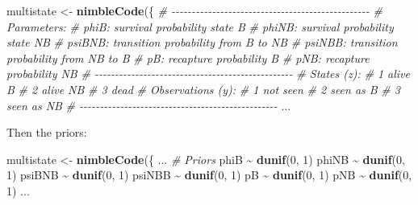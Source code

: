 \documentclass[
  12pt,
]{krantz}
\newenvironment{Shaded}{\begin{snugshade}}{\end{snugshade}}
\newcommand{\CommentTok}[1]{\textcolor[rgb]{0.56,0.35,0.01}{\textit{#1}}}
\newcommand{\DecValTok}[1]{\textcolor[rgb]{0.00,0.00,0.81}{#1}}
\newcommand{\FunctionTok}[1]{\textcolor[rgb]{0.13,0.29,0.53}{\textbf{#1}}}
\newcommand{\NormalTok}[1]{#1}
\newcommand{\OtherTok}[1]{\textcolor[rgb]{0.56,0.35,0.01}{#1}}
\newcommand{\SpecialCharTok}[1]{\textcolor[rgb]{0.81,0.36,0.00}{\textbf{#1}}}
\begin{document}
\begin{Shaded}
\begin{Highlighting}[]
\NormalTok{multistate }\OtherTok{\textless{}{-}} \FunctionTok{nimbleCode}\NormalTok{(\{}
  \CommentTok{\# {-}{-}{-}{-}{-}{-}{-}{-}{-}{-}{-}{-}{-}{-}{-}{-}{-}{-}{-}{-}{-}{-}{-}{-}{-}{-}{-}{-}{-}{-}{-}{-}{-}{-}{-}{-}{-}{-}{-}{-}{-}{-}{-}{-}{-}{-}{-}{-}{-}}
  \CommentTok{\# Parameters:}
  \CommentTok{\# phiB: survival probability state B}
  \CommentTok{\# phiNB: survival probability state NB}
  \CommentTok{\# psiBNB: transition probability from B to NB}
  \CommentTok{\# psiNBB: transition probability from NB to B}
  \CommentTok{\# pB: recapture probability B}
  \CommentTok{\# pNB: recapture probability NB}
  \CommentTok{\# {-}{-}{-}{-}{-}{-}{-}{-}{-}{-}{-}{-}{-}{-}{-}{-}{-}{-}{-}{-}{-}{-}{-}{-}{-}{-}{-}{-}{-}{-}{-}{-}{-}{-}{-}{-}{-}{-}{-}{-}{-}{-}{-}{-}{-}{-}{-}{-}{-}}
  \CommentTok{\# States (z):}
  \CommentTok{\# 1 alive B}
  \CommentTok{\# 2 alive NB}
  \CommentTok{\# 3 dead}
  \CommentTok{\# Observations (y):}
  \CommentTok{\# 1 not seen}
  \CommentTok{\# 2 seen as B}
  \CommentTok{\# 3 seen as NB}
  \CommentTok{\# {-}{-}{-}{-}{-}{-}{-}{-}{-}{-}{-}{-}{-}{-}{-}{-}{-}{-}{-}{-}{-}{-}{-}{-}{-}{-}{-}{-}{-}{-}{-}{-}{-}{-}{-}{-}{-}{-}{-}{-}{-}{-}{-}{-}{-}{-}{-}{-}{-}}
\NormalTok{...}
\end{Highlighting}
\end{Shaded}

Then the priors:

\begin{Shaded}
\begin{Highlighting}[]
\NormalTok{multistate }\OtherTok{\textless{}{-}} \FunctionTok{nimbleCode}\NormalTok{(\{}
\NormalTok{...}
  \CommentTok{\# Priors}
\NormalTok{  phiB }\SpecialCharTok{\textasciitilde{}} \FunctionTok{dunif}\NormalTok{(}\DecValTok{0}\NormalTok{, }\DecValTok{1}\NormalTok{)}
\NormalTok{  phiNB }\SpecialCharTok{\textasciitilde{}} \FunctionTok{dunif}\NormalTok{(}\DecValTok{0}\NormalTok{, }\DecValTok{1}\NormalTok{)}
\NormalTok{  psiBNB }\SpecialCharTok{\textasciitilde{}} \FunctionTok{dunif}\NormalTok{(}\DecValTok{0}\NormalTok{, }\DecValTok{1}\NormalTok{)}
\NormalTok{  psiNBB }\SpecialCharTok{\textasciitilde{}} \FunctionTok{dunif}\NormalTok{(}\DecValTok{0}\NormalTok{, }\DecValTok{1}\NormalTok{)}
\NormalTok{  pB }\SpecialCharTok{\textasciitilde{}} \FunctionTok{dunif}\NormalTok{(}\DecValTok{0}\NormalTok{, }\DecValTok{1}\NormalTok{)}
\NormalTok{  pNB }\SpecialCharTok{\textasciitilde{}} \FunctionTok{dunif}\NormalTok{(}\DecValTok{0}\NormalTok{, }\DecValTok{1}\NormalTok{)}
\NormalTok{...}
\end{Highlighting}
\end{Shaded}
\end{document}
